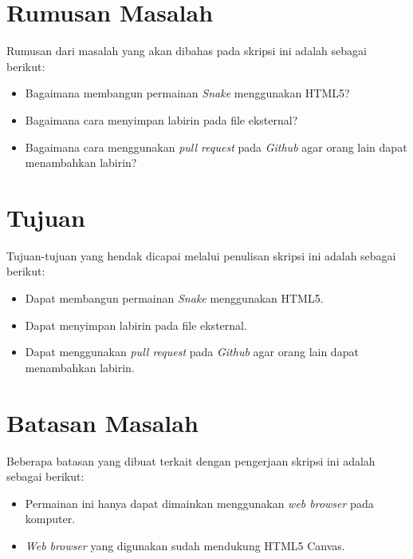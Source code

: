 
\section{Rumusan Masalah}
\label{sec:rumusan}
Rumusan dari masalah yang akan dibahas pada skripsi ini adalah sebagai berikut:
\begin{itemize}
	\item Bagaimana membangun permainan \textit{Snake} menggunakan HTML5?
	\item Bagaimana cara menyimpan labirin pada file eksternal?
	\item Bagaimana cara menggunakan \textit{pull request} pada \textit{Github} agar orang lain dapat menambahkan labirin?
\end{itemize}


\section{Tujuan}
\label{sec:tujuan}
Tujuan-tujuan yang hendak dicapai melalui penulisan skripsi ini adalah sebagai berikut:
\begin{itemize}
	\item Dapat membangun permainan \textit{Snake} menggunakan HTML5.
	\item Dapat menyimpan labirin pada file eksternal.
	\item Dapat menggunakan \textit{pull request} pada \textit{Github} agar orang lain dapat menambahkan labirin.
\end{itemize}


\section{Batasan Masalah}
\label{sec:batasan}
Beberapa batasan yang dibuat terkait dengan pengerjaan skripsi ini adalah sebagai berikut:
\begin{itemize}
	\item Permainan ini hanya dapat dimainkan menggunakan \textit{web browser} pada komputer.
	\item \textit{Web browser} yang digunakan sudah mendukung HTML5 Canvas.
\end{itemize}



